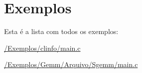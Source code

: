 \section{Exemplos}
Esta é a lista com todos os exemplos\+:\begin{DoxyCompactItemize}
\item 
\hyperlink{_2_exemplos_2clinfo_2main_8c-example}{/\+Exemplos/clinfo/main.\+c}
\item 
\hyperlink{_2_exemplos_2_gemm_2_arquivo_2_sgemm_2main_8c-example}{/\+Exemplos/\+Gemm/\+Arquivo/\+Sgemm/main.\+c}
\end{DoxyCompactItemize}
